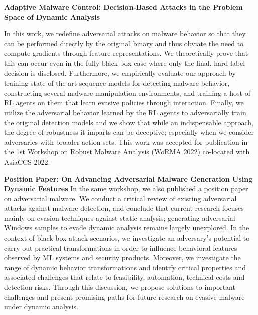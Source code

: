\textbf{Adaptive Malware Control: Decision-Based Attacks in the Problem Space of Dynamic Analysis}

In this work, we redefine adversarial attacks on malware behavior so that they can be performed directly by the original binary and thus obviate the need to compute gradients through feature representations.
We theoretically prove that this can occur even in the fully black-box case where only the final, hard-label decision is disclosed.
Furthermore, we empirically evaluate our approach by training state-of-the-art sequence models for detecting malware behavior, constructing several malware manipulation environments, and training a host of \gls{RL} agents on them that learn evasive policies through interaction.
Finally, we utilize the adversarial behavior learned by the RL agents to adversarially train the original detection models and we show that while an indispensable approach, the degree of robustness it imparts can be deceptive; especially when we consider adversaries with broader action sets.
This work was accepted for publication in the 1st Workshop on Robust Malware Analysis (WoRMA 2022) co-located with AsiaCCS 2022.

\begin{myleftbar}
\end{myleftbar}

\textbf{Position Paper: On Advancing Adversarial Malware Generation Using Dynamic Features}
In the same workshop, we also published a position paper on adversarial malware.
We conduct a critical review of existing adversarial attacks against malware detection, and conclude that current research focuses mainly on evasion techniques against static analysis; generating adversarial Windows samples to evade dynamic analysis remains largely unexplored.
In the context of black-box attack scenarios, we investigate an adversary's potential to carry out practical transformations in order to influence behavioral features observed by ML systems and security products. Moreover, we investigate the range of dynamic behavior transformations and identify critical properties and associated challenges that relate to feasibility, automation, technical costs and detection risks.
Through this discussion, we propose solutions to important challenges and present promising paths for future research on evasive malware under dynamic analysis.

\begin{myleftbar}
\end{myleftbar}

